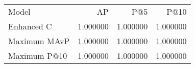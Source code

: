 \begin{tabular}{lrrr}
Model & AP & P@5 & P@10 \\
Enhanced C & 1.000000 & 1.000000 & 1.000000 \\
Maximum MAvP & 1.000000 & 1.000000 & 1.000000 \\
Maximum P@10 & 1.000000 & 1.000000 & 1.000000 \\
\end{tabular}
